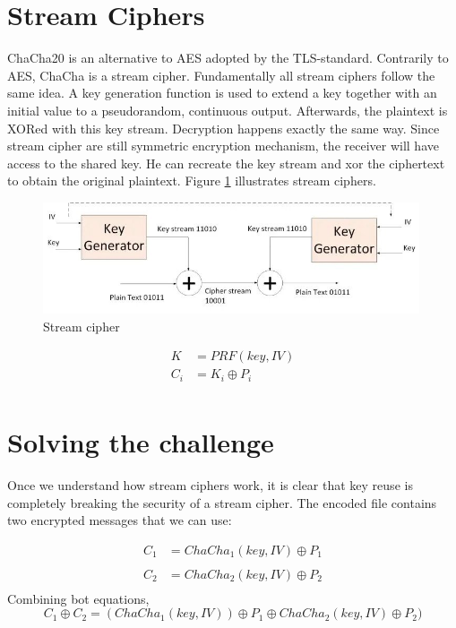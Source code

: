 \documentclass{article}
\begin{document}
\section*{Stream Ciphers}
ChaCha20 is an alternative to AES adopted by the TLS-standard. Contrarily to AES, ChaCha is a stream cipher. Fundamentally all stream ciphers follow the same idea. A key generation function is used to extend a key together with an initial value to a pseudorandom, continuous output. Afterwards, the plaintext is XORed with this key stream. Decryption happens exactly the same way. Since stream cipher are still symmetric encryption mechanism, the receiver will have access to the shared key. He can recreate the key stream and xor the ciphertext to obtain the original plaintext. Figure \ref{fig:stream} illustrates stream ciphers.

\begin{figure}[h]
    \centering
    \includegraphics[width=0.99\textwidth]{streamcipher.jpg}
    \caption{Stream cipher}
    \label{fig:stream}
\end{figure}

\begin{equation}
\begin{split}
    K &= PRF(key,IV) \\
    C_i &= K_i \oplus P_i \\ 
\end{split}
\end{equation}

\section*{Solving the challenge}
Once we understand how stream ciphers work, it is clear that key reuse is completely breaking the security of a stream cipher. The encoded file contains two encrypted messages that we can use:

\begin{equation}
\begin{split}
    C_1 &= ChaCha_1(key,IV) \oplus P_1 \\  \\
    C_2 &= ChaCha_2(key,IV) \oplus P_2 \\ 
\end{split}
\end{equation}
Combining bot equations,
\begin{equation}
    C_1 \oplus C_2 = (ChaCha_1(key,IV)) \oplus P_1 \oplus ChaCha_2(key,IV) \oplus P_2 )
\end{equation}
\end{document}
